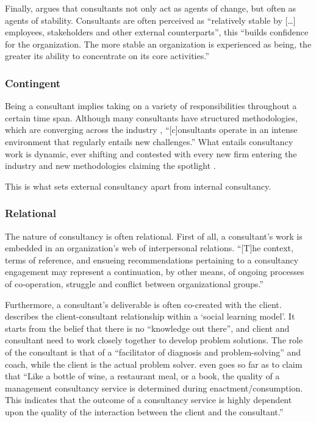 \documentclass[12pt]{article}
\begin{document}
Finally, \citet[272-273]{furusten2009} argues that consultants not only
act as agents of change, but often as agents of stability. Consultants
are often perceived as ``relatively stable by {[}\ldots{]} employees,
stakeholders and other external counterparts'', this ``builds confidence
for the organization. The more stable an organization is experienced as
being, the greater its ability to concentrate on its core activities.''

\hypertarget{contingent}{%
\subsubsection{Contingent}\label{contingent}}

Being a consultant implies taking on a variety of responsibilities
throughout a certain time span. Although many consultants have
structured methodologies, which are converging across the industry
\citep[ 17]{werr1986}, ``{[}c{]}onsultants operate in an intense
environment that regularly entails new challenges.'' \citep[
138]{chowdhury2021} What entails consultancy work is dynamic, ever
shifting and contested with every new firm entering the industry and new
methodologies claiming the spotlight \citep[ 24]{kipping2012}.

This is what sets external consultancy apart from internal consultancy.

\hypertarget{relational}{%
\subsubsection{Relational}\label{relational}}

The nature of consultancy is often relational. First of all, a
consultant's work is embedded in an organization's web of interpersonal
relations. ``{[}T{]}he context, terms of reference, and ensueing
recommendations pertaining to a consultancy engagement may represent a
continuation, by other means, of ongoing processes of co-operation,
struggle and conflict between organizational groups.''
\citep{bloomfield1995}

Furthermore, a consultant's deliverable is often co-created with the
client. \citet[290-297]{nikolova2009} describes the client-consultant
relationship within a `social learning model'. It starts from the belief
that there is no ``knowledge out there'', and client and consultant need
to work closely together to develop problem solutions. The role of the
consultant is that of a ``facilitator of diagnosis and problem-solving''
and coach, while the client is the actual problem solver.
\citet[22]{clark1998} even goes so far as to claim that ``Like a bottle
of wine, a restaurant meal, or a book, the quality of a management
consultancy service is determined during enactment/consumption. This
indicates that the outcome of a consultancy service is highly dependent
upon the quality of the interaction between the client and the
consultant.''
\end{document}
